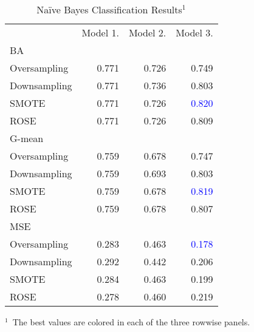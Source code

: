 \documentclass[5p, twocolumn, numbers, sort]{elsarticle}
\newcommand{\e}[1]{\textcolor{blue}{#1}}
\begin{document}
\begin{table}[th!b]
\centering
\caption{Na\"ive Bayes Classification Results$^1$}
\label{tab: classification naive bayes}
\begin{threeparttable}
\begin{tabularx}{\linewidth}{lrrr}
\toprule
& Model 1. & Model 2. & Model 3. \\
\cmidrule{2-4}
BA \\
\cmidrule{1-1}
Oversampling & 0.771 & 0.726 & 0.749 \\
Downsampling & 0.771 & 0.736 & 0.803 \\
SMOTE & 0.771 & 0.726 & \e{0.820} \\
ROSE & 0.771 & 0.726 & 0.809 \\
\cmidrule{2-4}
G-mean \\
\cmidrule{1-1}
Oversampling & 0.759 & 0.678 & 0.747 \\
Downsampling & 0.759 & 0.693 & 0.803 \\
SMOTE & 0.759 & 0.678 & \e{0.819} \\
ROSE & 0.759 & 0.678 & 0.807 \\
\cmidrule{2-4}
MSE & \\
\cmidrule{1-1}
Oversampling & 0.283 & 0.463 & \e{0.178} \\
Downsampling & 0.292 & 0.442 & 0.206 \\
SMOTE & 0.284 & 0.463 & 0.199 \\
ROSE & 0.278 & 0.460 & 0.219 \\
\bottomrule
\end{tabularx}
\begin{tablenotes}
\begin{scriptsize}
\item{$^1$~The best values are colored in each of the three rowwise panels.}
\end{scriptsize}
\end{tablenotes}
\end{threeparttable}
\end{table}
\end{document}
